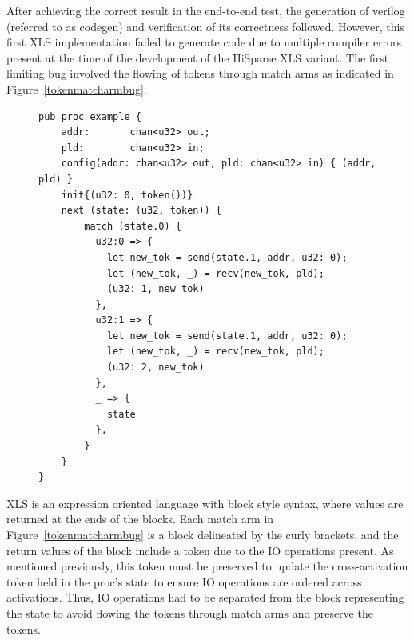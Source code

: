 
After achieving the correct result in the end-to-end test, the generation of verilog (referred to as codegen) and verification of its correctness followed. However, this first XLS implementation failed to generate code due to multiple compiler errors present at the time of the development of the HiSparse XLS variant. The first limiting bug involved the flowing of tokens through match arms as indicated in Figure~\ref{tokenmatcharmbug}.

\begin{figure}[ht]
\begin{lstlisting}[label={tokenmatcharmbug},caption={Example proc that failed to codegen due to tokens flowing through match arm results.}, captionpos=b,style=mystyle]
pub proc example {
    addr:       chan<u32> out;
    pld:        chan<u32> in;
    config(addr: chan<u32> out, pld: chan<u32> in) { (addr, pld) }    
    init{(u32: 0, token())}
    next (state: (u32, token)) {
        match (state.0) {
          u32:0 => {
            let new_tok = send(state.1, addr, u32: 0);
            let (new_tok, _) = recv(new_tok, pld);
            (u32: 1, new_tok)
          },
          u32:1 => {
            let new_tok = send(state.1, addr, u32: 0);
            let (new_tok, _) = recv(new_tok, pld);
            (u32: 2, new_tok)
          },
          _ => {
            state
          },
        }
    }
}
\end{lstlisting}
\end{figure}

XLS is an expression oriented language with block style syntax, where values are returned at the ends of the blocks. Each match arm in Figure~\ref{tokenmatcharmbug} is a block delineated by the curly brackets, and the return values of the block include a token due to the IO operations present. As mentioned previously, this token must be preserved to update the cross-activation token held in the proc's state to ensure IO operations are ordered across activations. Thus, IO operations had to be separated from the block representing the state to avoid flowing the tokens through match arms and preserve the tokens.

